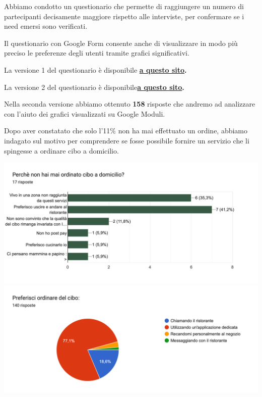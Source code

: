 \documentclass{article}
\begin{document}
    \vspace{2cm} \par 
    \vspace{0.5cm}
\par Abbiamo condotto un questionario che permette di raggiungere un numero di partecipanti decisamente maggiore rispetto alle interviste, per confermare se i need emersi sono verificati.\par Il questionario con Google Form consente anche di visualizzare in modo più preciso le preferenze degli utenti tramite grafici significativi.
\par La versione 1 del questionario è disponibile \textbf{\href{https://forms.gle/pBWCBfAxsjULCZRj6}{a questo sito}.}
\par La versione 2 del questionario è disponibile\textbf{\href{https://docs.google.com/forms/d/1ToAwRVi9a8q0_68hbEI7O8ORtodt_uTHuwU9ZtPfk1Q/edit}{a questo sito}.}
\par \vspace{1cm}
Nella seconda versione abbiamo ottenuto \textbf{158} risposte che andremo ad analizzare con l'aiuto dei grafici visualizzati su Google Moduli.\par \vspace{1cm}
\par Dopo aver constatato che solo l'11\% non ha mai effettuato un ordine, abbiamo indagato sul motivo per comprendere se fosse possibile fornire un servizio che li spingesse a ordinare cibo a domicilio.
\vspace{0.5cm}
\par 
\includegraphics[width=\textwidth]{Data/Grafici/Perche_non_ordina.png}
\includegraphics[width=\textwidth]{Data/Grafici/ordinare_cibo.png}
\end{document}
